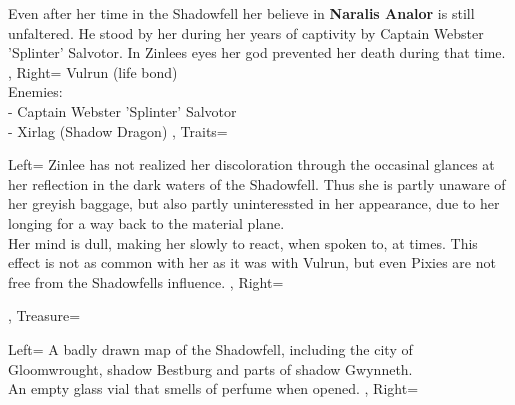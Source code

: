 \documentclass[10pt,a4paper]{scrbook}
\begin{document}
{{{				Even after her time in the Shadowfell her believe in \textbf{Naralis Analor} is still unfaltered. He stood by her during her years of captivity by Captain Webster 'Splinter' Salvotor. In Zinlees eyes her god prevented her death during that time.
			},
			Right={
				Vulrun (life bond)\\
				Enemies:\\
				- Captain Webster 'Splinter' Salvotor\\
				- Xirlag (Shadow Dragon)
			}
		},
		Traits={
			Left={
				Zinlee has not realized her discoloration through the occasinal glances at her reflection in the dark waters of the Shadowfell. Thus she is partly unaware of her greyish baggage, but also partly uninteressted in her appearance, due to her longing for a way back to the material plane.\\
				Her mind is dull, making her slowly to react, when spoken to, at times. This effect is not as common with her as it was with Vulrun, but even Pixies are not free from the Shadowfells influence.
			},
			Right={
				
			}
		},
		Treasure={
			Left={
				A badly drawn map of the Shadowfell, including the city of Gloomwrought, shadow Bestburg and parts of shadow Gwynneth.\\
				An empty glass vial that smells of perfume when opened.
			},
			Right={
				
			}
		}
	}

\end{document}
